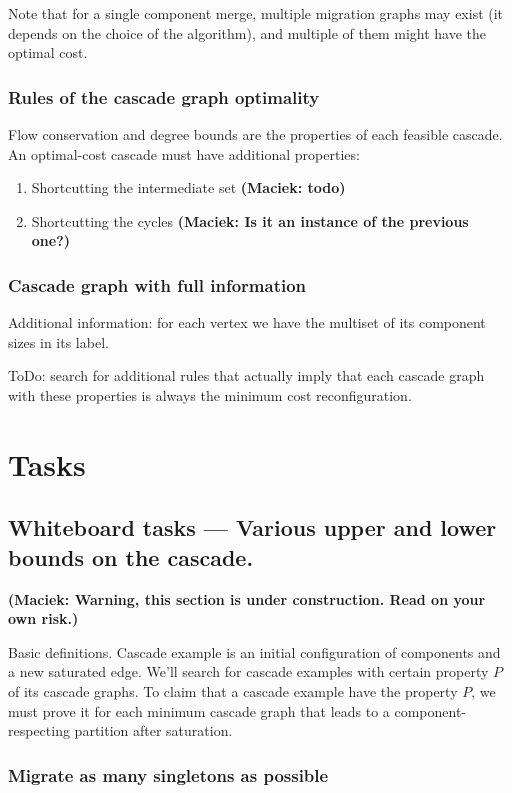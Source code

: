 \documentclass[a4paper,USenglish]{lipics-v2019}
\newcommand\maciek[1]{\color{brown}\textbf{(Maciek: #1)}\color{black}}
\begin{document}
Note that for a single component merge, multiple migration graphs may exist (it
depends on the choice of the algorithm), and multiple of them might have the optimal cost.

\subsubsection{Rules of the cascade graph optimality}

Flow conservation and degree bounds are the properties of each feasible cascade.
An optimal-cost cascade must have additional properties:
\begin{enumerate}
    \item Shortcutting the intermediate set \maciek{todo}
    \item Shortcutting the cycles \maciek{Is it an instance of the previous one?}
\end{enumerate}

\subsubsection{Cascade graph with full information}

Additional information: for each vertex we have the multiset of its component sizes in its label.

ToDo: search for additional rules that actually imply that each cascade graph with these properties is always the minimum cost reconfiguration.

\section{Tasks}

\subsection{Whiteboard tasks --- Various upper and lower bounds on the cascade.}

\maciek{Warning, this section is under construction. Read on your own risk.}

Basic definitions.
Cascade example is an initial configuration of components and a new saturated edge.
We'll search for cascade examples with certain property $P$ of its cascade graphs.
To claim that a cascade example have the property $P$, we must prove it for each minimum cascade graph that leads to a component-respecting partition after saturation.

\subsubsection{Migrate as many singletons as possible}
\end{document}
